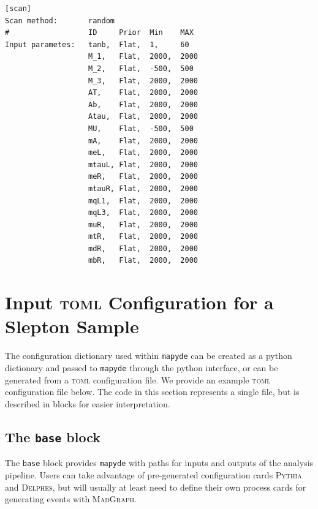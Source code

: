 \documentclass{article}
\newcommand{\mapyde}{\texttt{mapyde}}
\newcommand{\madgraph}{\textsc{MadGraph}}
\newcommand{\pythia}{\textsc{Pythia}}
\newcommand{\delphes}{\textsc{Delphes}}
\newcommand{\toml}{\textsc{toml}}
\begin{document}
\begin{listing}[H]
	\begin{verbatim}
[scan]
Scan method:       random
#                  ID     Prior  Min    MAX
Input parametes:   tanb,  Flat,  1,     60
                   M_1,   Flat,  2000,  2000
                   M_2,   Flat,  -500,  500
                   M_3,   Flat,  2000,  2000
                   AT,    Flat,  2000,  2000
                   Ab,    Flat,  2000,  2000
                   Atau,  Flat,  2000,  2000
                   MU,    Flat,  -500,  500
                   mA,    Flat,  2000,  2000
                   meL,   Flat,  2000,  2000
                   mtauL, Flat,  2000,  2000
                   meR,   Flat,  2000,  2000
                   mtauR, Flat,  2000,  2000
                   mqL1,  Flat,  2000,  2000
                   mqL3,  Flat,  2000,  2000
                   muR,   Flat,  2000,  2000
                   mtR,   Flat,  2000,  2000
                   mdR,   Flat,  2000,  2000
                   mbR,   Flat,  2000,  2000
  \end{verbatim}
	\caption{A portion of the \texttt{easyscan.ini} configuration defining the random sampling for the electroweakinos scan.}
	\label{lst:easyscanini}
\end{listing}

\section{Input \toml{} Configuration for a Slepton Sample}
\label{sec:input-configuration-for-a-slepton-sample}

The configuration dictionary used within \mapyde{} can be created as a python dictionary and passed to \mapyde{} through the python interface, or can be generated from a \toml{} configuration file.  We provide an example \toml{} configuration file below.  The code in this section represents a single file, but is described in blocks for easier interpretation.

\subsection{The \texttt{base} block}
\label{ssec:the-base-block}

The \texttt{base} block provides \mapyde{} with paths for inputs and outputs of the analysis pipeline.  Users can take advantage of pre-generated configuration cards \pythia{} and \delphes, but will usually at least need to define their own process cards for generating events with \madgraph.
\end{document}
